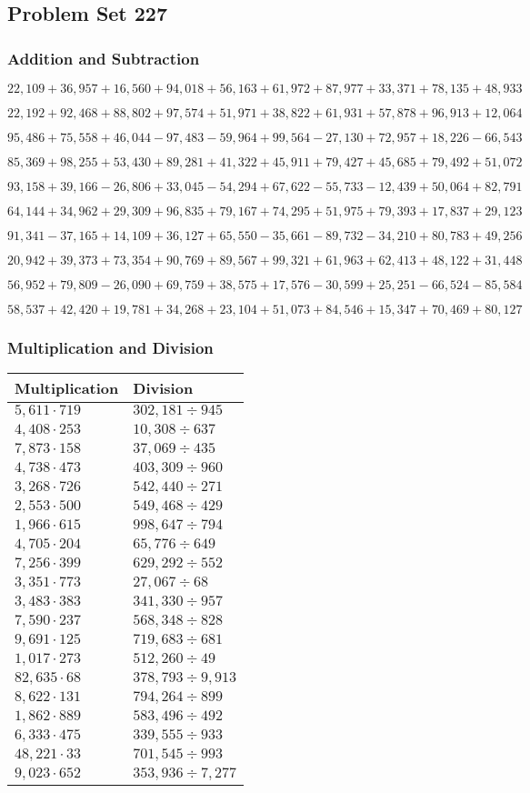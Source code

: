 \hypertarget{problem-set-227}{%
\subsection{Problem Set 227}\label{problem-set-227}}

\hypertarget{addition-and-subtraction}{%
\subsubsection{Addition and
Subtraction}\label{addition-and-subtraction}}

\(22,109+36,957+16,560+94,018+56,163+61,972+87,977+33,371+78,135+48,933\)

\(22,192+92,468+88,802+97,574+51,971+38,822+61,931+57,878+96,913+12,064\)

\(95,486+75,558+46,044-97,483-59,964+99,564-27,130+72,957+18,226-66,543\)

\(85,369+98,255+53,430+89,281+41,322+45,911+79,427+45,685+79,492+51,072\)

\(93,158+39,166-26,806+33,045-54,294+67,622-55,733-12,439+50,064+82,791\)

\(64,144+34,962+29,309+96,835+79,167+74,295+51,975+79,393+17,837+29,123\)

\(91,341-37,165+14,109+36,127+65,550-35,661-89,732-34,210+80,783+49,256\)

\(20,942+39,373+73,354+90,769+89,567+99,321+61,963+62,413+48,122+31,448\)

\(56,952+79,809-26,090+69,759+38,575+17,576-30,599+25,251-66,524-85,584\)

\(58,537+42,420+19,781+34,268+23,104+51,073+84,546+15,347+70,469+80,127\)

\hypertarget{multiplication-and-division}{%
\subsubsection{Multiplication and
Division}\label{multiplication-and-division}}

\begin{longtable}[]{@{}ll@{}}
\toprule
Multiplication & Division\tabularnewline
\midrule
\endhead
\(5,611\cdot719\) & \(302,181÷945\)\tabularnewline
\(4,408\cdot253\) & \(10,308÷637\)\tabularnewline
\(7,873\cdot158\) & \(37,069÷435\)\tabularnewline
\(4,738\cdot473\) & \(403,309÷960\)\tabularnewline
\(3,268\cdot726\) & \(542,440÷271\)\tabularnewline
\(2,553\cdot500\) & \(549,468÷429\)\tabularnewline
\(1,966\cdot615\) & \(998,647÷794\)\tabularnewline
\(4,705\cdot204\) & \(65,776÷649\)\tabularnewline
\(7,256\cdot399\) & \(629,292÷552\)\tabularnewline
\(3,351\cdot773\) & \(27,067÷68\)\tabularnewline
\(3,483\cdot383\) & \(341,330÷957\)\tabularnewline
\(7,590\cdot237\) & \(568,348÷828\)\tabularnewline
\(9,691\cdot125\) & \(719,683÷681\)\tabularnewline
\(1,017\cdot273\) & \(512,260÷49\)\tabularnewline
\(82,635\cdot68\) & \(378,793÷9,913\)\tabularnewline
\(8,622\cdot131\) & \(794,264÷899\)\tabularnewline
\(1,862\cdot889\) & \(583,496÷492\)\tabularnewline
\(6,333\cdot475\) & \(339,555÷933\)\tabularnewline
\(48,221\cdot33\) & \(701,545÷993\)\tabularnewline
\(9,023\cdot652\) & \(353,936÷7,277\)\tabularnewline
\bottomrule
\end{longtable}
